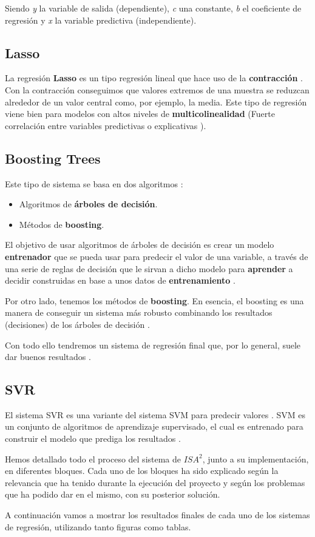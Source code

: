 Siendo \textit{y} la variable de salida (dependiente), \textit{c} una constante, \textit{b} el coeficiente de regresión y \textit{x} la variable predictiva (independiente).

\subsection{Lasso}

La regresión \textbf{Lasso} \cite{lasso} es un tipo regresión lineal que hace uso de la \textbf{contracción} \cite{shrinkage}. Con la contracción conseguimos que valores extremos de una muestra se reduzcan alrededor de un valor central como, por ejemplo, la media. Este tipo de regresión viene bien para modelos con altos niveles de \textbf{multicolinealidad} (Fuerte correlación entre variables predictivas o explicativas \cite{multicollinearity}).

\subsection{Boosting Trees}

Este tipo de sistema se basa en dos algoritmos \cite{boosting-trees}:

\begin{itemize}
\item Algoritmos de \textbf{árboles de decisión}.
\item Métodos de \textbf{boosting}.
\end{itemize}

El objetivo de usar algoritmos de árboles de decisión es crear un modelo \textbf{entrenador} que se pueda usar para predecir el valor de una variable, a través de una serie de reglas de decisión que le sirvan a dicho modelo para \textbf{aprender} a decidir construidas en base a unos datos de \textbf{entrenamiento} \cite{decision-tree}.

Por otro lado, tenemos los métodos de \textbf{boosting}. En esencia, el boosting es una manera de conseguir un sistema más robusto combinando los resultados (decisiones) de los árboles de decisión \cite{boosting}.

Con todo ello tendremos un sistema de regresión final que, por lo general, suele dar buenos resultados \cite{isa2}.

\subsection{SVR}

El sistema \ac{SVR} es una variante del sistema \ac{SVM} para predecir valores \cite{SVR}. \ac{SVM} es un conjunto de algoritmos de aprendizaje supervisado, el cual es entrenado para construir el modelo que prediga los resultados \cite{SVR}.

Hemos detallado todo el proceso del sistema de $ISA^{2}$, junto a su implementación, en diferentes bloques. Cada uno de los bloques ha sido explicado según la relevancia que ha tenido durante la ejecución del proyecto y según los problemas que ha podido dar en el mismo, con su posterior solución.

A continuación vamos a mostrar los resultados finales de cada uno de los sistemas de regresión, utilizando tanto figuras como tablas.

